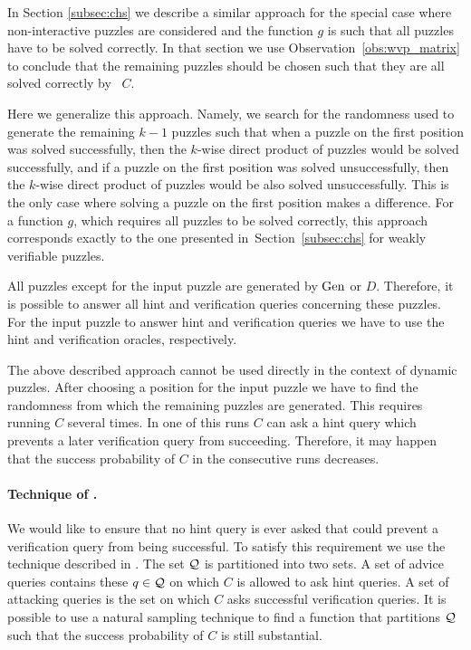 In Section \ref{subsec:chs} we describe a similar approach for the special case where
non-interactive puzzles are considered and the function $g$ is such that all puzzles have to be solved correctly.
In that section we use Observation~\ref{obs:wvp_matrix} to conclude that the remaining puzzles should be chosen such that they
are all solved correctly by~ $C$.

Here we generalize this approach. Namely, we search for the randomness used to generate the remaining $k\!-\!1$ puzzles
such that when a puzzle on the first position was solved successfully, then the $k$-wise direct product of puzzles would be solved successfully,
and if a puzzle on the first position was solved unsuccessfully, then the $k$-wise direct product of puzzles would be also solved unsuccessfully.
This is the only case where solving a puzzle on the first position makes a difference.
For a function $g$, which requires all puzzles to be solved correctly, this approach corresponds
exactly to the one presented in~Section~\ref{subsec:chs} for weakly verifiable puzzles.

All puzzles except for the input puzzle are generated by $\operatorname{\text{Gen}}$ or $D$.
Therefore, it is possible to answer all hint and verification queries concerning these puzzles.
For the input puzzle to answer hint and verification queries we have to use the hint and verification oracles, respectively.

The above described approach cannot be used directly in the context of dynamic puzzles.
After choosing a position for the input puzzle we have to find the randomness from which the remaining puzzles are generated.
This requires running $C$ several times. In one of this runs $C$ can ask a hint query which prevents a later verification query from succeeding.
Therefore, it may happen that the success probability of $C$ in the consecutive runs decreases.

\paragraph{Technique of \cite{dodis2009security}.}
We would like to ensure that no hint query is ever asked that could prevent a verification query from being successful.
To satisfy this requirement we use the technique described in \cite{dodis2009security}.
The set $\mathcal{Q}$ is partitioned into two sets. A set of advice queries contains these $q \in \mathcal{Q}$ on which
$C$ is allowed to ask hint queries. A set of attacking queries is the set on which $C$ asks successful verification queries.
It is possible to use a natural sampling technique to find a function that partitions $\mathcal{Q}$ such that
the success probability of $C$ is still substantial.

